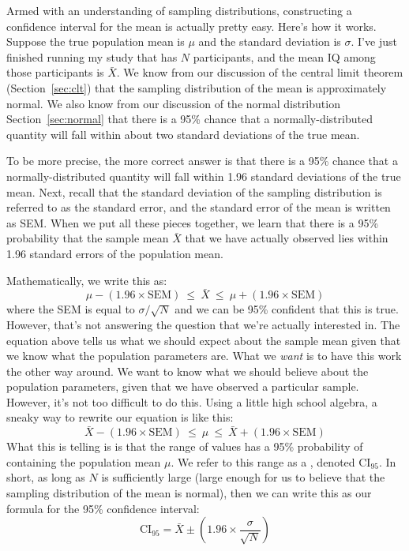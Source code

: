 Armed with an understanding of sampling distributions, constructing a confidence interval for the mean is actually pretty easy. Here's how it works. Suppose the true population mean is $\mu$ and the standard deviation is $\sigma$. I've just finished running my study that has $N$ participants, and the mean IQ among those participants is $\bar{X}$. We know from our discussion of the central limit theorem (Section~\ref{sec:clt}) that the sampling distribution of the mean is approximately normal. We also know from our discussion of the normal distribution Section~\ref{sec:normal} that there is a 95\% chance that a normally-distributed quantity will fall within about two standard deviations of the true mean. 

To be more precise, the more correct answer is that there is a 95\% chance that a normally-distributed quantity will fall within 1.96 standard deviations of the true mean. Next, recall that the standard deviation of the sampling distribution is referred to as the standard error, and the standard error of the mean is written as SEM. When we put all these pieces together, we learn that there is a 95\% probability that the sample mean $\bar{X}$ that we have actually observed lies within 1.96 standard errors of the population mean. 

\vspace{0.5cm}
Mathematically, we write this as:
$$
\mu - \left( 1.96 \times \mbox{SEM} \right) \ \leq \  \bar{X}\  \leq \  \mu + \left( 1.96 \times \mbox{SEM} \right) 
$$
where the SEM is equal to $\sigma / \sqrt{N}$ and we can be 95\% confident that this is true. However, that's not answering the question that we're actually interested in. The equation above tells us what we should expect about the sample mean given that we know what the population parameters are. What we {\it want} is to have this work the other way around. We want to know what we should believe about the population parameters, given that we have observed a particular sample. However, it's not too difficult to do this. Using a little high school algebra, a sneaky way to rewrite our equation is like this:
$$
\bar{X} -  \left( 1.96 \times \mbox{SEM} \right) \ \leq \ \mu  \ \leq  \ \bar{X} +  \left( 1.96 \times \mbox{SEM}\right)
$$
What this is telling is is that the range of values has a 95\% probability of containing the population mean $\mu$. We refer to this range as a , denoted $\mbox{CI}_{95}$. In short, as long as $N$ is sufficiently large (large enough for us to believe that the sampling distribution of the mean is normal), then we can write this as our formula for the 95\% confidence interval:
$$
\mbox{CI}_{95} = \bar{X} \pm \left( 1.96 \times \frac{\sigma}{\sqrt{N}} \right)
$$

